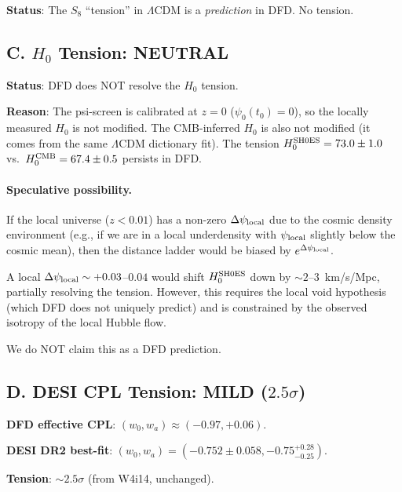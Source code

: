 \documentclass[11pt,a4paper]{article}
\newcounter{findingctr}
\newenvironment{finding}[1][]{%
  \refstepcounter{findingctr}%
  \begin{tcolorbox}[colback=blue!3!white, colframe=blue!50!black,
    title=\textbf{Finding \thefindingctr: #1}]
}{%
  \end{tcolorbox}%
}
\newcommand{\LCDM}{$\Lambda$CDM}
\newcommand{\Dpsi}{\Delta\psi}
\begin{document}
\begin{finding}[\textbf{Tensions}: $A_{\rm lens}$ and $S_8$ Resolved;
  $H_0$ Neutral; $w_a$ Mild]
\begin{tcolorbox}[colback=green!5!white, colframe=green!60!black]
\textbf{Status}: The $S_8$ ``tension'' in \LCDM{} is a
\emph{prediction} in DFD.  No tension.
\end{tcolorbox}

\subsection*{C. $H_0$ Tension: NEUTRAL}

\begin{tcolorbox}[colback=yellow!5!white, colframe=yellow!60!black]
\textbf{Status}: DFD does NOT resolve the $H_0$ tension.

\textbf{Reason}: The psi-screen is calibrated at $z = 0$
($\psi_0(t_0) = 0$), so the locally measured $H_0$ is not modified.
The CMB-inferred $H_0$ is also not modified (it comes from the same
\LCDM{} dictionary fit).  The tension $H_0^{\rm SH0ES} = 73.0 \pm 1.0$
vs.\ $H_0^{\rm CMB} = 67.4 \pm 0.5$ persists in DFD.
\end{tcolorbox}

\paragraph{Speculative possibility.}
If the local universe ($z < 0.01$) has a non-zero $\Dpsi_{\rm local}$
due to the cosmic density environment (e.g., if we are in a local
underdensity with $\psi_{\rm local}$ slightly below the cosmic mean),
then the distance ladder would be biased by $e^{\Dpsi_{\rm local}}$.

A local $\Dpsi_{\rm local} \sim +0.03$--$0.04$ would shift $H_0^{\rm SH0ES}$
down by $\sim 2$--$3$~km/s/Mpc, partially resolving the tension.
However, this requires the local void hypothesis (which DFD does not
uniquely predict) and is constrained by the observed isotropy of
the local Hubble flow.

We do NOT claim this as a DFD prediction.

\subsection*{D. DESI CPL Tension: MILD ($2.5\sigma$)}

\begin{tcolorbox}[colback=orange!5!white, colframe=orange!60!black]
\textbf{DFD effective CPL}: $(w_0, w_a) \approx (-0.97, +0.06)$.

\textbf{DESI DR2 best-fit}: $(w_0, w_a) = (-0.752 \pm 0.058,
-0.75^{+0.28}_{-0.25})$.

\textbf{Tension}: $\sim 2.5\sigma$ (from W4i14, unchanged).
\end{tcolorbox}


\end{finding}
\end{document}

